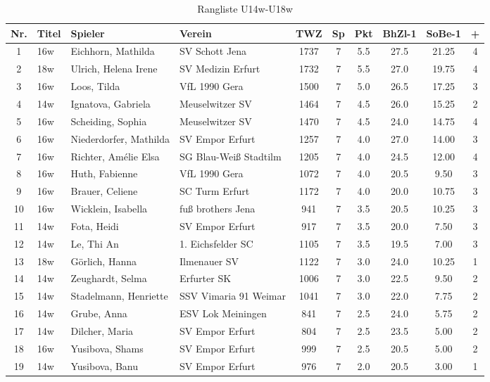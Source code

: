 \begin{table}[H]
\centering
\begin{tabular}{|c|l|l|l|c|c|c|c|c|c|}
\hline
Nr. & Titel & Spieler & Verein & TWZ & Sp & Pkt & BhZl-1 & SoBe-1 & + \\ \hline
1 & 16w & Eichhorn, Mathilda & SV Schott Jena & 1737 & 7 & 5.5 & 27.5 & 21.25 & 4 \\
2 & 18w & Ulrich, Helena Irene & SV Medizin Erfurt & 1732 & 7 & 5.5 & 27.0 & 19.75 & 4 \\
3 & 16w & Loos, Tilda & VfL 1990 Gera & 1500 & 7 & 5.0 & 26.5 & 17.25 & 3 \\
4 & 14w & Ignatova, Gabriela & Meuselwitzer SV & 1464 & 7 & 4.5 & 26.0 & 15.25 & 2 \\
5 & 16w & Scheiding, Sophia & Meuselwitzer SV & 1470 & 7 & 4.5 & 24.0 & 14.75 & 4 \\
6 & 16w & Niederdorfer, Mathilda & SV Empor Erfurt & 1257 & 7 & 4.0 & 27.0 & 14.00 & 3 \\
7 & 16w & Richter, Amélie Elsa & SG Blau-Weiß Stadtilm & 1205 & 7 & 4.0 & 24.5 & 12.00 & 4 \\
8 & 16w & Huth, Fabienne & VfL 1990 Gera & 1072 & 7 & 4.0 & 20.5 & 9.50 & 3 \\
9 & 16w & Brauer, Celiene & SC Turm Erfurt & 1172 & 7 & 4.0 & 20.0 & 10.75 & 3 \\
10 & 16w & Wicklein, Isabella & fuß brothers Jena & 941 & 7 & 3.5 & 20.5 & 10.25 & 3 \\
11 & 14w & Fota, Heidi & SV Empor Erfurt & 917 & 7 & 3.5 & 20.0 & 7.50 & 3 \\
12 & 14w & Le, Thi An & 1. Eichsfelder SC & 1105 & 7 & 3.5 & 19.5 & 7.00 & 3 \\
13 & 18w & Görlich, Hanna & Ilmenauer SV & 1122 & 7 & 3.0 & 24.0 & 10.25 & 1 \\
14 & 14w & Zeughardt, Selma & Erfurter SK & 1006 & 7 & 3.0 & 22.5 & 9.50 & 2 \\
15 & 14w & Stadelmann, Henriette & SSV Vimaria 91 Weimar & 1041 & 7 & 3.0 & 22.0 & 7.75 & 2 \\
16 & 14w & Grube, Anna & ESV Lok Meiningen & 841 & 7 & 2.5 & 24.0 & 5.75 & 2 \\
17 & 14w & Dilcher, Maria & SV Empor Erfurt & 804 & 7 & 2.5 & 23.5 & 5.00 & 2 \\
18 & 16w & Yusibova, Shams & SV Empor Erfurt & 999 & 7 & 2.5 & 20.5 & 5.00 & 2 \\
19 & 14w & Yusibova, Banu & SV Empor Erfurt & 976 & 7 & 2.0 & 20.5 & 3.00 & 1 \\ \hline
\end{tabular}
\caption{Rangliste U14w-U18w}
\label{tab:Rangliste_U14w-U18w}
\end{table}